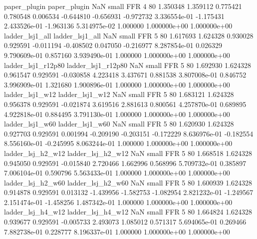             paper_plugin             paper_plugin                   NaN      small      FFR                 4 80 1.350348       1.359112 0.775421       0.780548    0.006534     -0.644810     -0.656931    -0.972732   3.336554e-01 -1.175431 2.433526e-01    -1.963136   5.314975e-02            1.000000    1.000000e+00        1.000000e+00
         ladder_lsj1_all          ladder_lsj1_all                   NaN      small      FFR                 5 80 1.617693       1.624328 0.930028       0.929591   -0.011194     -0.408502      0.047050    -0.216977   8.287854e-01  0.026329 9.790609e-01     0.857160   3.939490e-01            1.000000    1.000000e+00        1.000000e+00
      ladder_lsj1_r12p80       ladder_lsj1_r12p80                   NaN      small      FFR                 5 80 1.692930       1.624328 0.961547       0.929591   -0.030858      4.223418      3.437671     0.881538   3.807008e-01  0.846752 3.996909e-01     1.321680   1.900896e-01            1.000000    1.000000e+00        1.000000e+00
         ladder_lsj1_w12          ladder_lsj1_w12                   NaN      small      FFR                 5 80 1.683121       1.624328 0.956378       0.929591   -0.021874      3.619516      2.881613     0.800561   4.257870e-01  0.689895 4.922818e-01     0.884495   3.791130e-01            1.000000    1.000000e+00        1.000000e+00
         ladder_lsj1_w60          ladder_lsj1_w60                   NaN      small      FFR                 5 80 1.620930       1.624328 0.927703       0.929591    0.001994     -0.209190     -0.203151    -0.172229   8.636976e-01 -0.182554 8.556160e-01    -0.245995   8.063244e-01            1.000000    1.000000e+00        1.000000e+00
       ladder_lsj_h2_w12        ladder_lsj_h2_w12                   NaN      small      FFR                 5 80 1.668518       1.624328 0.945050       0.929591   -0.015840      2.720466      1.662996     0.568996   5.709732e-01  0.385897 7.006104e-01     0.590796   5.563433e-01            1.000000    1.000000e+00        1.000000e+00
       ladder_lsj_h2_w60        ladder_lsj_h2_w60                   NaN      small      FFR                 5 80 1.600939       1.624328 0.914878       0.929591    0.013132     -1.439956     -1.582753    -1.082954   2.821232e-01 -1.249567 2.151474e-01    -1.458256   1.487342e-01            1.000000    1.000000e+00        1.000000e+00
       ladder_lsj_h4_w12        ladder_lsj_h4_w12                   NaN      small      FFR                 5 80 1.664824       1.624328 0.939677       0.929591   -0.005733      2.493073      1.085012     0.571317   5.694065e-01  0.269466 7.882738e-01     0.228777   8.196337e-01            1.000000    1.000000e+00        1.000000e+00
